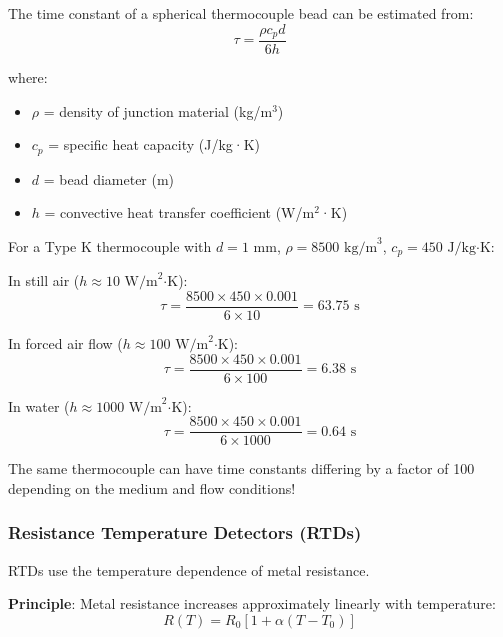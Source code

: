 \begin{example}
\label{ex:thermocouple_time_constant}

The time constant of a spherical thermocouple bead can be estimated from:
\begin{equation}
\tau = \frac{\rho c_p d}{6h}
\label{eq:tc_time_constant}
\end{equation}

where:
\begin{itemize}
    \item $\rho$ = density of junction material (kg/m$^3$)
    \item $c_p$ = specific heat capacity (J/kg·K)
    \item $d$ = bead diameter (m)
    \item $h$ = convective heat transfer coefficient (W/m$^2$·K)
\end{itemize}

For a Type K thermocouple with $d = 1\text{ mm}$, $\rho = 8500\text{ kg/m}^3$, $c_p = 450\text{ J/kg·K}$:

In still air ($h \approx 10\text{ W/m}^2\text{·K}$):
\begin{equation}
\tau = \frac{8500 \times 450 \times 0.001}{6 \times 10} = 63.75\text{ s}
\end{equation}

In forced air flow ($h \approx 100\text{ W/m}^2\text{·K}$):
\begin{equation}
\tau = \frac{8500 \times 450 \times 0.001}{6 \times 100} = 6.38\text{ s}
\end{equation}

In water ($h \approx 1000\text{ W/m}^2\text{·K}$):
\begin{equation}
\tau = \frac{8500 \times 450 \times 0.001}{6 \times 1000} = 0.64\text{ s}
\end{equation}

The same thermocouple can have time constants differing by a factor of 100 depending on the medium and flow conditions!
\end{example}

\subsubsection{Resistance Temperature Detectors (RTDs)}

RTDs use the temperature dependence of metal resistance.

\textbf{Principle}: Metal resistance increases approximately linearly with temperature:
\begin{equation}
R(T) = R_0[1 + \alpha(T - T_0)]
\label{eq:rtd}
\end{equation}

